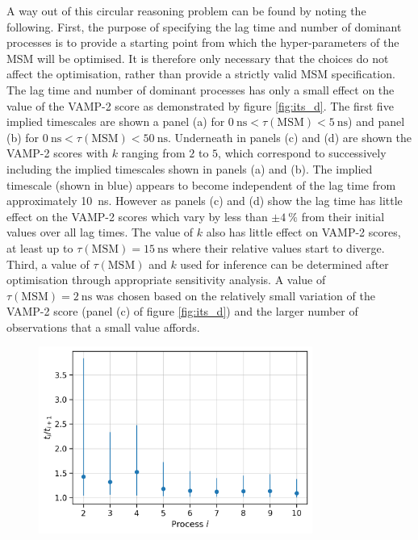 A way out of this circular reasoning problem can be found by noting the following. First, the purpose of specifying the lag time and number of dominant processes is to provide a starting point from which the hyper-parameters of the MSM will be optimised. It is therefore only necessary that the choices do not affect the optimisation, rather than provide a strictly valid MSM specification. The lag time and number of dominant processes has only a small effect on the value of the VAMP-2 score as demonstrated by figure \ref{fig:its_d}. The first five implied timescales are shown a panel (a)  for $\SI{0}{\nano\second} < \tau(\mathrm{MSM}) < \SI{5}{\nano\second}$) and panel (b) for $\SI{0}{\nano\second} < \tau(\mathrm{MSM}) < \SI{50}{\nano\second}$. Underneath in panels (c) and (d) are shown the VAMP-2 scores with $k$ ranging from $2$ to $5$, which correspond to successively including the implied timescales shown in panels (a) and (b). The implied timescale (shown in blue) appears to become independent of the lag time from approximately \SI{10}{\nano\second}. However as panels (c) and (d) show the lag time has little effect on the VAMP-2 scores which vary by less than $\pm\SI{4}{\percent}$ from their initial values over all lag times. The value of $k$ also has little effect on VAMP-2 scores, at least up to $\tau(\mathrm{MSM})=\SI{15}{\nano\second}$ where their relative values start to diverge. Third, a  value of $\tau(\mathrm{MSM})$ and $k$ used for inference can be determined after optimisation through appropriate sensitivity analysis. A value of $\tau(\mathrm{MSM})=\SI{2}{\nano\second}$ was chosen based on the relatively small variation of the VAMP-2 score (panel (c) of figure \ref{fig:its_d}) and the larger number of observations that a small value affords. 

\begin{figure}
    \centering
    \includegraphics[width=0.8\textwidth]{chapters/aadh/figures/timescale_ratios_D.png}
    \label{fig:ts_ratios_d}
\end{figure}

